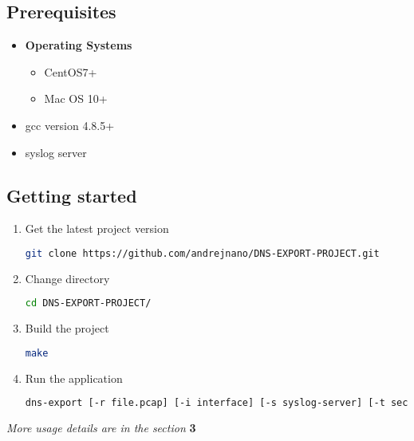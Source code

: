 \subsection{Prerequisites}

\begin{itemize}

\item \textbf{Operating Systems}
    \begin{itemize}
    \item CentOS7+
    \item Mac OS 10+
    \end{itemize}
\item gcc version 4.8.5+
\item syslog server

\end{itemize}


\subsection{Getting started}

\begin{enumerate}
\item Get the latest project version
\begin{lstlisting}[language=Bash] 
 git clone https://github.com/andrejnano/DNS-EXPORT-PROJECT.git 
\end{lstlisting}
\item Change directory
\begin{lstlisting}[language=Bash] 
cd DNS-EXPORT-PROJECT/
\end{lstlisting}
\item Build the project
\begin{lstlisting}[language=Bash] 
make
\end{lstlisting}
\item Run the application
\begin{lstlisting}[language=Bash] 
dns-export [-r file.pcap] [-i interface] [-s syslog-server] [-t seconds]
\end{lstlisting}
\end{enumerate}

\textit{More usage details are in the section} \textbf{3}